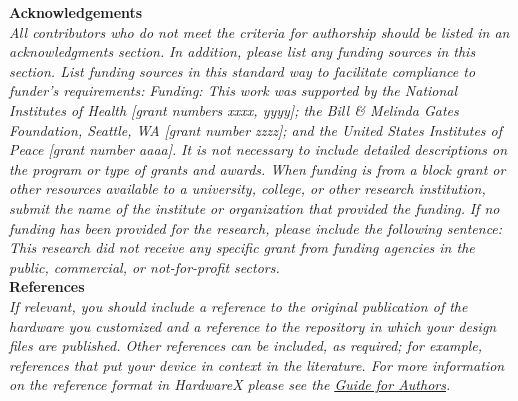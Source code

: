 \documentclass[11pt, letterpaper]{article}
\begin{document}
\noindent
\textbf{Acknowledgements}\\
\noindent
\textit{All contributors who do not meet the criteria for authorship should be listed in an acknowledgments section.} 
\vskip 0.2cm
\noindent
\textit{In addition, please list any funding sources in this section. List funding sources in this standard way to facilitate compliance to funder's requirements:}
\vskip 0.2cm
\noindent
\textit{Funding: This work was supported by the National Institutes of Health [grant numbers xxxx, yyyy]; the Bill \& Melinda Gates Foundation, Seattle, WA [grant number zzzz]; and the United States Institutes of Peace [grant number aaaa].}
\vskip 0.2cm
\noindent
\textit{It is not necessary to include detailed descriptions on the program or type of grants and awards. When funding is from a block grant or other resources available to a university, college, or other research institution, submit the name of the institute or organization that provided the funding.}
\vskip 0.2cm
\noindent
\textit{If no funding has been provided for the research, please include the following sentence:}
\vskip 0.2cm
\noindent
\textit{This research did not receive any specific grant from funding agencies in the public, commercial, or not-for-profit sectors.
}\\


\noindent
\textbf{References}\\
\noindent 
\textit{If relevant, you should include a reference to the original publication of the hardware you customized and a reference to the repository in which your design files are published.  Other references can be included, as required; for example, references that put your device in context in the literature. For more information on the reference format in HardwareX please see the \href{https://www.elsevier.com/journals/hardwarex/2468-0672/guide-for-authors}{\underline{Guide for Authors}}.}
\end{document}
